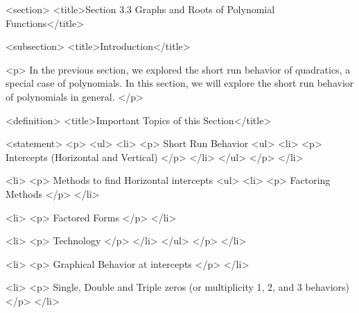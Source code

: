 <section>
    <title>Section 3.3 Graphs and Roots of Polynomial Functions</title>

    <subsection>
        <title>Introduction</title>

        <p>
            In the previous section, we explored the short run behavior of quadratics, a special case of polynomials.
            In this section, we will explore the short run behavior of polynomials in general.
        </p>

        <definition>
            <title>Important Topics of this Section</title>

            <statement>
                <p>
                    <ul>
                        <li>
                            <p>
                                Short Run Behavior
                                <ul>
                                    <li>
                                        <p>
                                            Intercepts (Horizontal and Vertical)
                                        </p>
                                    </li>
                                </ul>
                            </p>
                        </li>

                        <li>
                            <p>
                                Methods to find Horizontal intercepts
                                <ul>
                                    <li>
                                        <p>
                                            Factoring Methods
                                        </p>
                                    </li>

                                    <li>
                                        <p>
                                            Factored Forms
                                        </p>
                                    </li>

                                    <li>
                                        <p>
                                            Technology
                                        </p>
                                    </li>
                                </ul>
                            </p>
                        </li>

                        <li>
                            <p>
                                Graphical Behavior at intercepts
                            </p>
                        </li>

                        <li>
                            <p>
                                Single, Double and Triple zeros (or multiplicity 1, 2, and 3 behaviors)
                            </p>
                        </li>

